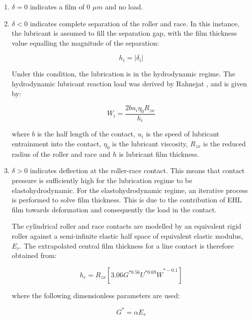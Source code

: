 \begin{enumerate}
	\item $\delta=0$ indicates a film of 0 $\mu m$ and no load.
	\item $\delta<0$ indicates complete separation of the roller and race. In this instance, the lubricant is assumed to fill the separation gap, with the film thickness value equalling the magnitude of the separation:
	
	\begin{equation}\label{hydrodynamic film thickness}
		h_i=\left|\delta_i\right|
	\end{equation}

	Under this condition, the lubrication is in the hydrodynamic regime. The hydrodynamic lubricant reaction load was derived by Rahnejat \cite{Rahnejat1984}, and is given by:
	
	\begin{equation}\label{hydrodynamic reaction load}
		W_i=\frac{2 b u_i \eta_0 R_{z x}}{h_i}
	\end{equation}

	where $b$ is the half length of the contact, $u_i$ is the speed of lubricant entrainment into the contact, $\eta_0$ is the lubricant viscosity, $R_{zx}$ is the reduced radius of the roller and race and $h$ is lubricant film thickness. 
	
	\item $\delta>0$ indicates deflection at the roller-race contact. This means that contact pressure is sufficiently high for the lubrication regime to be elastohydrodynamic. For the elastohydrodynamic regime, an iterative process is performed to solve film thickness. This is due to the contribution of EHL film towards deformation and consequently the load in the contact.
	
	The cylindrical roller and race contacts are modelled by an equivalent rigid roller against a semi-infinite elastic half space of equivalent elastic modulus, $E_r$. The extrapolated central film thickness for a line contact is therefore obtained \cite{Dowson1979} from:  
	
	\begin{equation}\label{dimensionless central film thickness}
	h_c=R_{zx}\left[{3.06G}^{\ast0.56}{U^{\ast0.69}W}^{\ast-0.1}\right]
    \end{equation}

	where the following dimensionless parameters are used:
		
	\begin{equation}\label{Gstar}
		G^*=\alpha E_r 
	\end{equation}
	

\end{enumerate}
